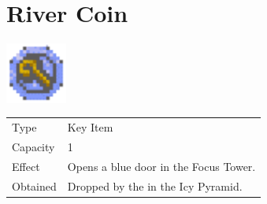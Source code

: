\section{River Coin}
\label{item:river_coin}

\includegraphics[height=2cm,keepaspectratio]{./resources/items/rivercoin}

\begin{longtable}{ l p{9cm} }
	Type
	& Key Item
\\ %
	Capacity
	& 1
\\ %
	Effect
	& Opens a blue door in the Focus Tower.
\\ %
	Obtained
	& Dropped by the \nameref{monster:ice_golem} in the Icy Pyramid.
\end{longtable}

